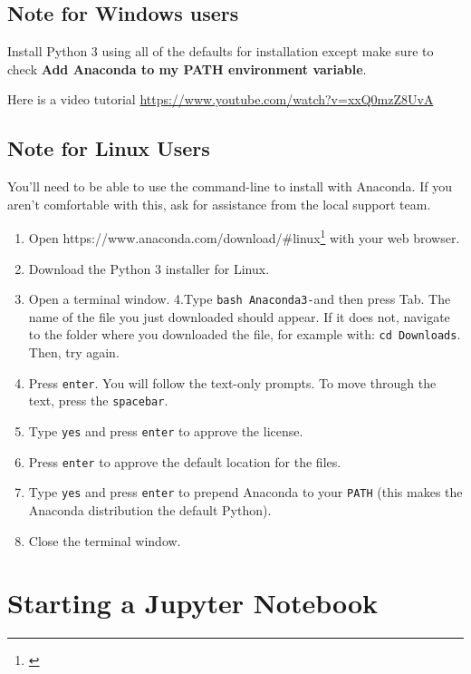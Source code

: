 \documentclass[
]{book}
\providecommand{\tightlist}{%
  \setlength{\itemsep}{0pt}\setlength{\parskip}{0pt}}
\renewcommand{\href}[2]{#2\footnote{\url{#1}}}
\begin{document}
\hypertarget{note-for-windows-users}{%
\subsection{Note for Windows users}\label{note-for-windows-users}}

Install Python 3 using all of the defaults for installation except make sure to check \textbf{Add Anaconda to my PATH environment variable}.

Here is a video tutorial \url{https://www.youtube.com/watch?v=xxQ0mzZ8UvA}

\hypertarget{note-for-linux-users}{%
\subsection{Note for Linux Users}\label{note-for-linux-users}}

You'll need to be able to use the command-line to install with Anaconda. If you aren't comfortable with this, ask for assistance from the local support team.

\begin{enumerate}
\def\labelenumi{\arabic{enumi}.}
\tightlist
\item
  Open \href{}{https://www.anaconda.com/download/\#linux} with your web browser.
\item
  Download the Python 3 installer for Linux.
\item
  Open a terminal window.
  4.Type \texttt{bash\ Anaconda3-}and then press Tab. The name of the file you just downloaded should appear. If it does not, navigate to the folder where you downloaded the file, for example with: \texttt{cd\ Downloads}. Then, try again.
\item
  Press \texttt{enter}. You will follow the text-only prompts. To move through the text, press the \texttt{spacebar}.
\item
  Type \texttt{yes} and press \texttt{enter} to approve the license.
\item
  Press \texttt{enter} to approve the default location for the files.
\item
  Type \texttt{yes} and press \texttt{enter} to prepend Anaconda to your \texttt{PATH} (this makes the Anaconda distribution the default Python).
\item
  Close the terminal window.
\end{enumerate}

\hypertarget{starting-a-jupyter-notebook}{%
\section{Starting a Jupyter Notebook}\label{starting-a-jupyter-notebook}}
\end{document}
